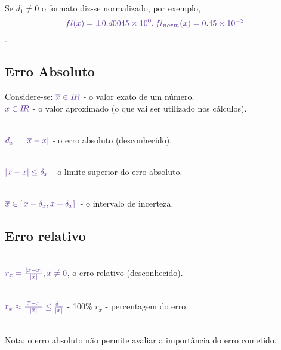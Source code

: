 \documentclass[12pt, a4paper, titlepage, oneside, dvipsnames]{report}
\begin{document}
        \begin{paragraph}\\
        Se {\color{RoyalPurple} \(d_1 \neq 0\)} o formato diz-se {\color{Mahogany} normalizado}, por exemplo, 
        \[
            \color{RoyalPurple}
            fl(x) = \pm 0.d0045 \times 10^0, fl_{norm}(x) = 0.45 \times 10^{-2} 
        \].
        \end{paragraph}

    \subsection{\color{RoyalPurple} Erro Absoluto}
        Considere-se:
        \(\color{RoyalPurple} \overline{x} \in I\!R\) - o valor exato de um número.\\
        \(\color{RoyalPurple} x \in I\!R\) - o valor aproximado (o que vai ser utilizado nos cálculos).\\

        \begin{paragraph}\\ 
        \(\color{RoyalPurple} d_x = \lvert \overline{x} - x \rvert\) - o {\color{Mahogany} erro absoluto} (desconhecido).
        \end{paragraph}
        \begin{paragraph}\\
        \(\color{RoyalPurple} \lvert \overline{x} - x \rvert \leq \delta_x\) - o limite superior do erro absoluto.
        \end{paragraph}
        \begin{paragraph}\\
        \(\color{RoyalPurple} \overline{x} \in [ \, x - \delta_x, x + \delta_x ] \,\) - o intervalo de incerteza.
        \end{paragraph}

    \subsection{\color{RoyalPurple} Erro relativo}

        \begin{paragraph}\\ 
        \(\color{RoyalPurple} r_x = \frac{\lvert \overline{x} - x \rvert}{\lvert \overline{x} \rvert}, \overline{x} \neq 0 \),
         o {\color{Mahogany} erro relativo} (desconhecido).
        \end{paragraph}
        \begin{paragraph}\\
        \(\color{RoyalPurple} r_x \approx \frac{\lvert \overline{x} - x \rvert}{\lvert \overline{x} \rvert} \leq \frac{\delta_x}{\lvert x \rvert}\) 
        - {\color{RoyalPurple} 100\% $r_x$} - percentagem do erro.
        \end{paragraph}
        \begin{paragraph}\\
        {\color{Mahogany} Nota:} o erro absoluto não permite avaliar a importância do erro cometido.
        \end{paragraph}
    
\end{document}
